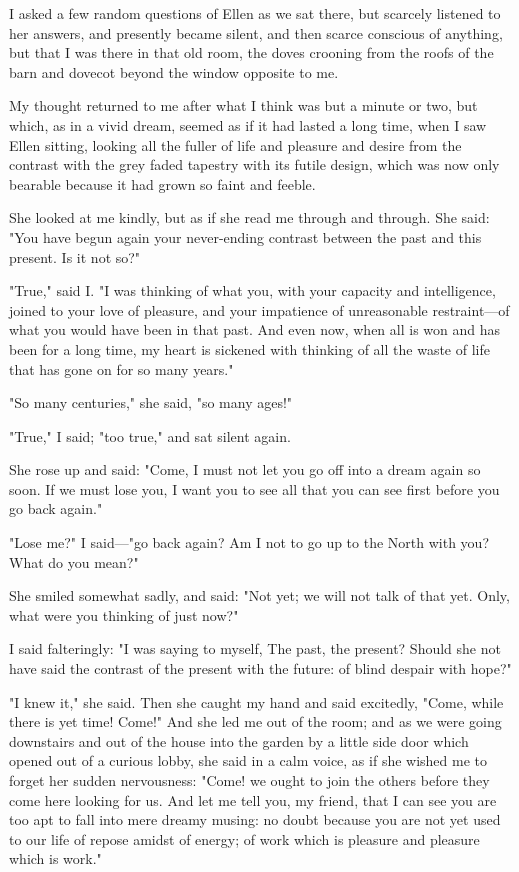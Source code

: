 I asked a few random questions of Ellen as we sat there, but scarcely
listened to her answers, and presently became silent, and then scarce
conscious of anything, but that I was there in that old room, the doves
crooning from the roofs of the barn and dovecot beyond the window
opposite to me.

My thought returned to me after what I think was but a minute or two,
but which, as in a vivid dream, seemed as if it had lasted a long time,
when I saw Ellen sitting, looking all the fuller of life and pleasure
and desire from the contrast with the grey faded tapestry with its
futile design, which was now only bearable because it had grown so faint
and feeble.

She looked at me kindly, but as if she read me through and through. She
said: "You have begun again your never-ending contrast between the past
and this present. Is it not so?"

"True," said I. "I was thinking of what you, with your capacity and
intelligence, joined to your love of pleasure, and your impatience of
unreasonable restraint---of what you would have been in that past. And
even now, when all is won and has been for a long time, my heart is
sickened with thinking of all the waste of life that has gone on for so
many years."

"So many centuries," she said, "so many ages!"

"True," I said; "too true," and sat silent again.

She rose up and said: "Come, I must not let you go off into a dream
again so soon. If we must lose you, I want you to see all that you can
see first before you go back again."

"Lose me?" I said---"go back again? Am I not to go up to the North with
you? What do you mean?"

She smiled somewhat sadly, and said: "Not yet; we will not talk of that
yet. Only, what were you thinking of just now?"

I said falteringly: "I was saying to myself, The past, the present?
Should she not have said the contrast of the present with the future: of
blind despair with hope?"

"I knew it," she said. Then she caught my hand and said excitedly,
"Come, while there is yet time! Come!" And she led me out of the room;
and as we were going downstairs and out of the house into the garden by
a little side door which opened out of a curious lobby, she said in a
calm voice, as if she wished me to forget her sudden nervousness: "Come!
we ought to join the others before they come here looking for us. And
let me tell you, my friend, that I can see you are too apt to fall into
mere dreamy musing: no doubt because you are not yet used to our life of
repose amidst of energy; of work which is pleasure and pleasure which is
work."

